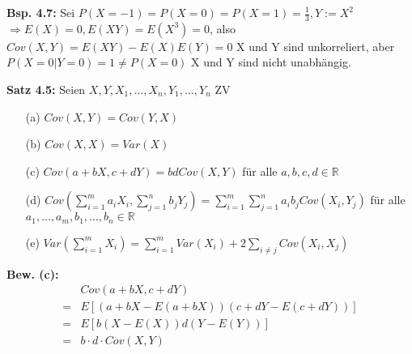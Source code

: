 \documentclass[a4paper,11pt]{article}
\begin{document}
\vspace{6pt}
\noindent\textbf{Bsp. 4.7:} Sei $P(X=-1)=P(X=0)=P(X=1)=\frac{1}{3}, Y:=X^2$
\newline $\Rightarrow E(X)=0,E(XY)=E(X^3)=0$, also
\newline $Cov(X,Y)=E(XY)-E(X)E(Y)=0$
\newline X und Y sind unkorreliert, aber
\newline $P(X=0|Y=0)=1 \neq P(X=0)$
\newline X und Y sind nicht unabhängig.

\vspace{6pt}
\noindent\textbf{Satz 4.5:} Seien $X,Y,X_1,\dots,X_n,Y_1,\dots,Y_n$ ZV
\begin{itemize}
\item[(a)] $Cov(X,Y) = Cov(Y,X)$
\item[(b)] $Cov(X,X) = Var(X)$
\item[(c)] $Cov(a+bX,c+dY) = bdCov(X,Y)$ für alle $a,b,c,d\in\mathbb{R}$
\item[(d)] $Cov(\sum_{i=1}^{m}a_iX_i,\sum_{j=1}^{n}b_jY_j) = \sum_{i=1}^{m}\sum_{j=1}^{n}a_ib_jCov(X_i,Y_j)$ für alle $a_1,\dots,a_m,b_1,\dots,b_n\in\mathbb{R}$
\item[(e)] $Var(\sum_{i=1}^{m}X_i)=\sum_{i=1}^{m}Var(X_i)+2\sum_{i\neq j}Cov(X_i,X_j)$
\end{itemize} 

\noindent\textbf{Bew. (c):}
\begin{align*}
& Cov(a+bX,c+dY)\\
=&E[(a+bX-E(a+bX))(c+dY-E(c+dY))]\\
=&E[b(X-E(X))d(Y-E(Y))]\\
=&b\cdot d\cdot Cov(X,Y)\\
\end{align*}
\end{document}
